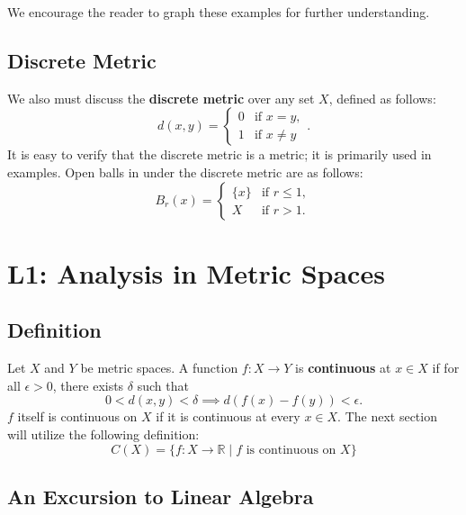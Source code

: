 \documentclass[11pt]{article}
\begin{document}
We encourage the reader to graph these examples for further understanding.


\subsection{Discrete Metric}

We also must discuss the \textbf{discrete metric} over any set $X$, defined as follows:
\[
	d(x, y) = 
	\begin{cases}
		0 & \text{if } x = y, \\
		1 & \text{if } x \ne y
	\end{cases}.
\]
It is easy to verify that the discrete metric is a metric; it is primarily used in examples. Open balls in under the discrete metric are as follows:
\[
	B_{r}(x) = 
	\begin{cases}
		\{ x \} & \text{if } r \le 1, \\
		X & \text{if } r > 1.
	\end{cases}
\]


\section{L1: Analysis in Metric Spaces}


\subsection{Definition}

Let $X$ and $Y$ be metric spaces. A function $f: X \to Y$ is \textbf{continuous} at $x \in X$ if for all $\epsilon > 0$, there exists $\delta$ such that 
\[
	0 < d(x, y) < \delta \implies d(f(x) - f(y)) < \epsilon.
\]
$f$ itself is continuous on $X$ if it is continuous at every $x \in X$. The next section will utilize the following definition: 
\[
	C(X) = \{ f : X \to \mathbb{R} \mid f \text{ is continuous on } X \}
\]


\subsection{An Excursion to Linear Algebra}
\end{document}
